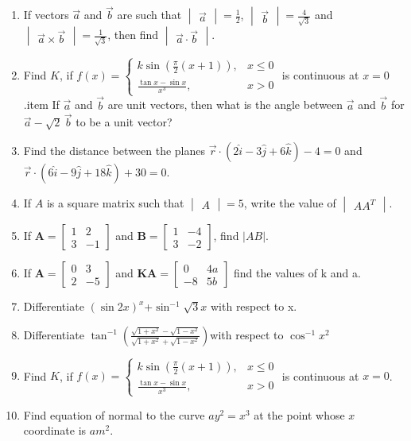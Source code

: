 \documentclass[12pt,-letter paper]{article}
\let\vec\mathbf{}
\let\vec\mathbf{}
\let\vec\mathbf{}
\providecommand{\mydet}[1]{\ensuremath{\begin{vmatrix}#1\end{vmatrix}}}
\providecommand{\myvec}[1]{\ensuremath{\begin{bmatrix}#1\end{bmatrix}}}
\providecommand{\brak}[1]{\ensuremath{\left(#1\right)}}
\begin{document}
\begin{enumerate}
	\item If vectors $\overrightarrow{a}$ and $\overrightarrow{b}$ are such that $\mydet{\overrightarrow{a}}= \frac{1}{2}$, $\mydet{\overrightarrow{b}} = \frac{4}{\sqrt{3}}$ and $\mydet{\overrightarrow{a} \times \overrightarrow{b}} = \frac{1}{\sqrt{3}}$, then find $\mydet{\overrightarrow{a} \cdot \overrightarrow{b}}$.

\item Find $K$, if $f(x) = \begin{cases}
 k \sin\left(\frac{\pi}{2}(x+1)\right), & x \leq 0 \\
\frac{\tan{x} - \sin{x}}{x^3}, & x > 0                         \end{cases}$ is continuous at $x = 0$.item If $\overrightarrow{a}$ and $\overrightarrow{b}$ are unit vectors, then what is the angle between $\overrightarrow{a}$ and $\overrightarrow{b}$ for $\overrightarrow{a} - \sqrt{2} \, \overrightarrow{b}$ to be a unit vector? 
\item Find the distance between the planes $ \overrightarrow{r} \cdot (2\hat{i} - 3\hat{j} + 6\hat{k}) - 4 = 0$ and $ \overrightarrow{r} \cdot (6\hat{i} - 9\hat{j} + 18\hat{k}) + 30 = 0.$
\item If $ A $ is a square matrix such that $\mydet{A} = 5 $, write the value of $\mydet{AA^T} $.
\item If $\vec{A}=\myvec{1 & 2 \\ 3 & -1}$ and  $\vec{B} = \myvec {1 & -4 \\ 3 & -2 }$, find $|AB|$.	
\item If $\vec{A}=\myvec{0 & 3 \\ 2 & -5}$ and $\vec{KA}=\myvec{0 & 4a \\ -8 & 5b }$ find the values of k and a.	
\item Differentiate $(\sin{2x})^x$+$\sin^{-1}\sqrt3x$ with respect to x. 
\item Differentiate $\tan^{-1}{\brak{\frac{\sqrt{1+x^2}-\sqrt{1-x^2}}{\sqrt{1+x^2}+\sqrt{1-x^2}}} }$with respect to $\cos^{-1}{x^2}$
\item Find $K$, if $f(x) = \begin{cases} 
k \sin\left(\frac{\pi}{2}(x+1)\right), & x \leq 0 \\
	\frac{\tan{x} - \sin{x}}{x^3}, & x > 0 
\end{cases}$ is continuous at $x = 0$.
\item Find equation of normal to the curve $ay^2=x^3$ at the point whose $x$ coordinate is $am^2$.

\end{enumerate}
\end{document}

